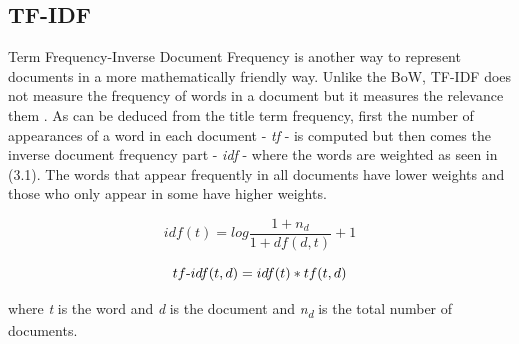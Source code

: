 \subsection{TF-IDF}
Term Frequency-Inverse Document Frequency is another way to represent documents in a more mathematically friendly way. Unlike the BoW, TF-IDF does not measure the frequency of words in a document but it measures the relevance them . As can be deduced from the title term frequency, first the number of appearances of a word in each document - \textit{tf} - is computed but then comes the inverse document frequency part - \textit{idf} - where the words are weighted as seen in (3.1). The words that appear frequently in all documents have lower weights and those who only appear in some have higher weights.

\begin{equation}
idf(t) = log\frac{1+n_d}{1+df(d,t)} + 1
\end{equation}

\begin{equation}
tf\textnormal{-}idf(t,d) = idf(t)*tf(t,d) 
\end{equation}

where \textit{t} is the word and \textit{d} is the document and \textit{n\textsubscript{d}} is the total number of documents. 

